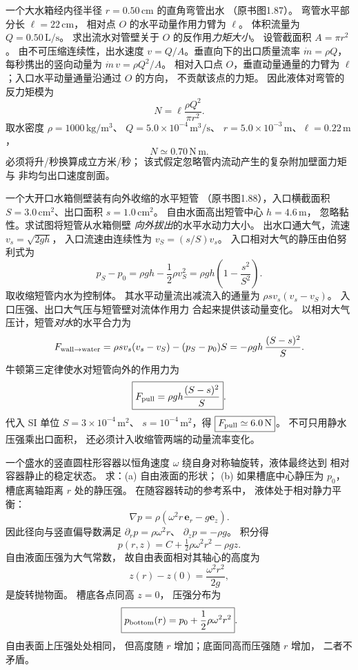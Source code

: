 一个大水箱经内径半径
$r=0.50\,\mathrm{cm}$ 的直角弯管出水
（原书图1.87）。
弯管水平部分长 $\ell=22\,\mathrm{cm}$，
相对点 $O$ 的水平动量作用力臂为 $\ell$。
体积流量为 $Q=0.50\,\mathrm{L/s}$。
求出流水对管壁关于 $O$ 的反作用\emph{力矩大小}。
\exsolution
设管截面积 $A=\pi r^2$。
由不可压缩连续性，出水速度
$v=Q/A$。垂直向下的出口质量流率
$\dot m=\rho Q$，每秒携出的竖向动量为
$\dot m\,v=\rho Q^2/A$。
相对入口点 $O$，垂直动量通量的力臂为
$\ell$；入口水平动量通量沿通过 $O$ 的方向，
不贡献该点的力矩。
因此液体对弯管的反力矩模为
\[
\boxed{N=\ell\frac{\rho Q^2}{\pi r^2}}.
\]
取水密度 $\rho=1000\,\mathrm{kg/m^3}$、
$Q=5.0\times10^{-4}\,\mathrm{m^3/s}$、
$r=5.0\times10^{-3}\,\mathrm m$、$\ell=0.22\,\mathrm m$，
\[
\boxed{N\simeq0.70\,\mathrm{N\,m}}.
\]
\excheck 必须将升/秒换算成立方米/秒；
该式假定忽略管内流动产生的复杂附加壁面力矩与
非均匀出口速度剖面。

一个大开口水箱侧壁装有向外收缩的水平短管
（原书图1.88），入口横截面积
$S=3.0\,\mathrm{cm^2}$、出口面积
$s=1.0\,\mathrm{cm^2}$。
自由水面高出短管中心 $h=4.6\,\mathrm m$，
忽略黏性。求试图将短管从水箱侧壁
\emph{向外拔出}的水平水动力大小。
\exsolution
出水口通大气，流速
$v_s=\sqrt{2gh}$，
入口流速由连续性为
$v_S=(s/S)v_s$。
入口相对大气的静压由伯努利式为
\[
p_S-p_0=\rho gh-\frac12\rho v_S^2
=\rho gh\left(1-\frac{s^2}{S^2}\right).
\]
取收缩短管内水为控制体。
其水平动量流出减流入的通量为
$\rho s v_s(v_s-v_S)$。
入口压强、出口大气压与短管壁对流体作用力
合起来提供该动量变化。
以相对大气压计，短管\emph{对水}的水平合力为
\[
F_{{\rm wall}\to{\rm water}}
=\rho s v_s(v_s-v_S)-(p_S-p_0)S
=-\rho gh\,\frac{(S-s)^2}{S}.
\]
牛顿第三定律使水对短管向外的作用力为
\[
\boxed{F_{\rm pull}=\rho gh\frac{(S-s)^2}{S}}.
\]
代入 SI 单位 $S=3\times10^{-4}\,\mathrm{m^2}$、
$s=10^{-4}\,\mathrm{m^2}$，得
$\boxed{F_{\rm pull}\simeq6.0\,\mathrm N}$。
\excheck 不可只用静水压强乘出口面积，
还必须计入收缩管两端的动量流率变化。

一个盛水的竖直圆柱形容器以恒角速度
$\omega$ 绕自身对称轴旋转，液体最终达到
相对容器静止的稳定状态。
求：(a) 自由液面的形状；
(b) 如果槽底中心静压为 $p_0$，
槽底离轴距离 $r$ 处的静压强。
\exsolution
在随容器转动的参考系中，
液体处于相对静力平衡：
\[
\nabla p=\rho(\omega^2r\,\bm e_r-g\bm e_z).
\]
因此径向与竖直偏导数满足
$\partial_rp=\rho\omega^2r$、
$\partial_zp=-\rho g$。
积分得
\[
p(r,z)=C+\tfrac12\rho\omega^2r^2-\rho gz.
\]
自由液面压强为大气常数，
故自由表面相对其轴心的高度为
\[
\boxed{z(r)-z(0)=\frac{\omega^2r^2}{2g}},
\]
是旋转抛物面。
槽底各点同高 $z=0$，
压强分布为
\[
\boxed{p_{\rm bottom}(r)=p_0+\frac12\rho\omega^2r^2}.
\]
\excheck 自由表面上压强处处相同，
但高度随 $r$ 增加；底面同高而压强随 $r$ 增加，
二者不矛盾。

